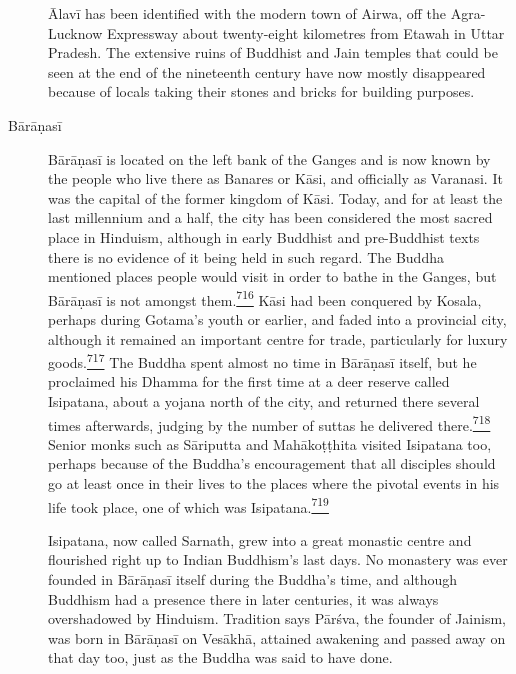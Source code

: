 \begin{description}
Ālavī has been identified with the modern town of Airwa, off the
Agra-Lucknow Expressway about twenty-eight kilometres from Etawah in
Uttar Pradesh. The extensive ruins of Buddhist and Jain temples that
could be seen at the end of the nineteenth century have now mostly
disappeared because of locals taking their stones and bricks for
building purposes.
\item[Bārāṇasī]
Bārāṇasī is located on the left bank of the Ganges and is now known by
the people who live there as Banares or Kāsi, and officially as
Varanasi. It was the capital of the former kingdom of Kāsi. Today, and
for at least the last millennium and a half, the city has been
considered the most sacred place in Hinduism, although in early Buddhist
and pre-Buddhist texts there is no evidence of it being held in such
regard. The Buddha mentioned places people would visit in order to bathe
in the Ganges, but Bārāṇasī is not amongst
them.\label{footprints_split_019.html_fnref716}\hyperref[footprints_split_025.htmlux5cux23fn716]{\textsuperscript{716}}
Kāsi had been conquered by Kosala, perhaps during Gotama's youth or
earlier, and faded into a provincial city, although it remained an
important centre for trade, particularly for luxury
goods.\label{footprints_split_019.html_fnref717}\hyperref[footprints_split_025.htmlux5cux23fn717]{\textsuperscript{717}}
The Buddha spent almost no time in Bārāṇasī itself, but he proclaimed
his Dhamma for the first time at a deer reserve called Isipatana, about
a yojana north of the city, and returned there several times afterwards,
judging by the number of suttas he delivered
there.\label{footprints_split_019.html_fnref718}\hyperref[footprints_split_025.htmlux5cux23fn718]{\textsuperscript{718}}
Senior monks such as Sāriputta and Mahākoṭṭhita visited Isipatana too,
perhaps because of the Buddha's encouragement that all disciples should
go at least once in their lives to the places where the pivotal events
in his life took place, one of which was
Isipatana.\label{footprints_split_019.html_fnref719}\hyperref[footprints_split_025.htmlux5cux23fn719]{\textsuperscript{719}}

Isipatana, now called Sarnath, grew into a great monastic centre and
flourished right up to Indian Buddhism's last days. No monastery was
ever founded in Bārāṇasī itself during the Buddha's time, and although
Buddhism had a presence there in later centuries, it was always
overshadowed by Hinduism. Tradition says Pārśva, the founder of Jainism,
was born in Bārāṇasī on Vesākhā, attained awakening and passed away on
that day too, just as the Buddha was said to have done.


\end{description}
